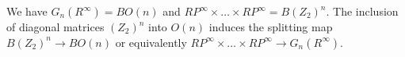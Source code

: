 We have $G_n(R^\infty) = BO(n)$ and $RP^\infty \times \dots \times RP^\infty = B(Z_2)^n$. The inclusion of diagonal matrices $(Z_2)^n$ into $O(n)$ induces the splitting map $B(Z_2)^n \rightarrow BO(n)$ or equivalently $RP^\infty \times \dots \times RP^\infty \rightarrow G_n(R^\infty)$.
